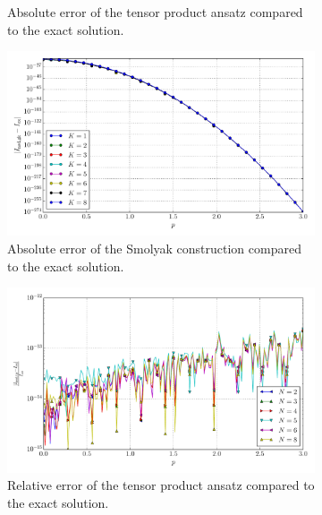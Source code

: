 \documentclass[a4paper,10pt]{article}
\begin{document}
\begin{figure}[ht!]
\begin{subfigure}[t]{0.5\linewidth}
    \caption{Absolute error of the tensor product ansatz compared to the exact solution.}
    \label{fig:tp_sg_6d_conv_p_000000_000000_err_nsd_tp}
  \end{subfigure}
  \begin{subfigure}[t]{0.5\linewidth}
    \includegraphics[width=\linewidth]{./plots/tp_sg_6d_conv_p_(0,0,0,0,0,0)_(0,0,0,0,0,0)_err_nsd_gk.pdf}
    \caption{Absolute error of the Smolyak construction compared to the exact solution.}
    \label{fig:tp_sg_6d_conv_p_000000_000000_err_nsd_gk}
  \end{subfigure}
  \begin{subfigure}[t]{0.5\linewidth}
    \includegraphics[width=\linewidth]{./plots/tp_sg_6d_conv_p_(0,0,0,0,0,0)_(0,0,0,0,0,0)_err_rel_nsd_tp.pdf}
    \caption{Relative error of the tensor product ansatz compared to the exact solution.}
    \label{fig:tp_sg_6d_conv_p_000000_000000_err_rel_nsd_tp}
  \end{subfigure}
  \begin{subfigure}[t]{0.5\linewidth}

\end{subfigure}
\end{figure}
\end{document}
